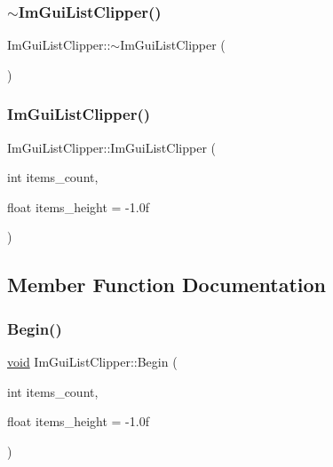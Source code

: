 \subsubsection{\texorpdfstring{$\sim$\+Im\+Gui\+List\+Clipper()}{~ImGuiListClipper()}}
{\footnotesize\ttfamily Im\+Gui\+List\+Clipper\+::$\sim$\+Im\+Gui\+List\+Clipper (\begin{DoxyParamCaption}{ }\end{DoxyParamCaption})}

\mbox{\label{structImGuiListClipper_aa102d8c5cde9d8bf8dc5707c1d6fb96e}} 
\subsubsection{\texorpdfstring{Im\+Gui\+List\+Clipper()}{ImGuiListClipper()}\hspace{0.1cm}{\footnotesize\ttfamily [2/2]}}
{\footnotesize\ttfamily Im\+Gui\+List\+Clipper\+::\+Im\+Gui\+List\+Clipper (\begin{DoxyParamCaption}\item[{int}]{items\+\_\+count,  }\item[{float}]{items\+\_\+height = {\ttfamily -\/1.0f} }\end{DoxyParamCaption})\hspace{0.3cm}{\ttfamily [inline]}}



\subsection{Member Function Documentation}
\mbox{\label{structImGuiListClipper_a746fbd724a41dbe88fef4875a2b1e9c7}} 
\subsubsection{\texorpdfstring{Begin()}{Begin()}}
{\footnotesize\ttfamily \hyperlink{imgui__impl__opengl3__loader_8h_ac668e7cffd9e2e9cfee428b9b2f34fa7}{void} Im\+Gui\+List\+Clipper\+::\+Begin (\begin{DoxyParamCaption}\item[{int}]{items\+\_\+count,  }\item[{float}]{items\+\_\+height = {\ttfamily -\/1.0f} }\end{DoxyParamCaption})}


